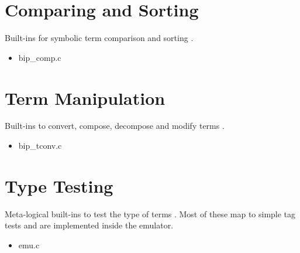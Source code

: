 \section{Comparing and Sorting }
     Built-ins for symbolic term comparison and sorting .
     \begin{itemize}
     \item bip_comp.c
     \end{itemize}

\section{Term Manipulation }
     Built-ins to convert, compose, decompose and modify terms .
     \begin{itemize}
     \item bip_tconv.c
     \end{itemize}

\section{Type Testing }
     Meta-logical built-ins to test the type of terms .
     Most of these map to simple tag tests and are implemented
     inside the emulator.
     \begin{itemize}
     \item emu.c
     \end{itemize}
